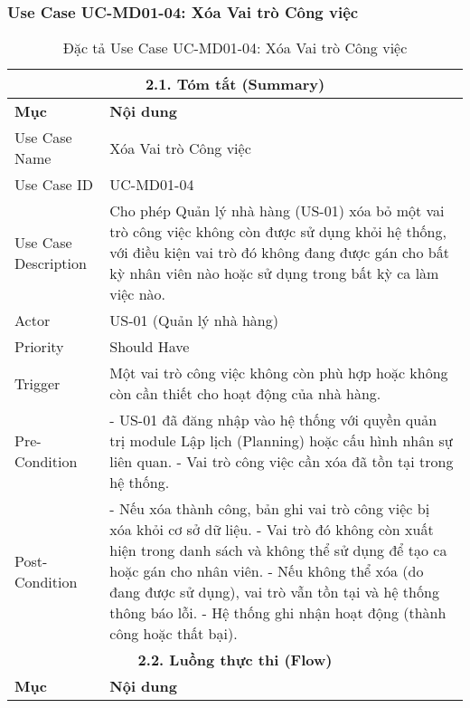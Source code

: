\subsubsection{Use Case UC-MD01-04: Xóa Vai trò Công việc}

\begin{longtable}{|m{4cm}|p{11cm}|}
\caption{Đặc tả Use Case UC-MD01-04: Xóa Vai trò Công việc} \label{tab:uc_md01_04_revised} \\
\hline
\multicolumn{2}{|c|}{\textbf{2.1. Tóm tắt (Summary)}} \\
\hline
\textbf{Mục} & \textbf{Nội dung} \\
\hline
\endhead %
\hline
\endfoot %
\hline
\endlastfoot %
Use Case Name & Xóa Vai trò Công việc \\
\hline
Use Case ID & UC-MD01-04 \\
\hline
Use Case Description & Cho phép Quản lý nhà hàng (US-01) xóa bỏ một vai trò công việc không còn được sử dụng khỏi hệ thống, với điều kiện vai trò đó không đang được gán cho bất kỳ nhân viên nào hoặc sử dụng trong bất kỳ ca làm việc nào. \\
\hline
Actor & US-01 (Quản lý nhà hàng) \\
\hline
Priority & Should Have \\
\hline
Trigger & Một vai trò công việc không còn phù hợp hoặc không còn cần thiết cho hoạt động của nhà hàng. \\
\hline
Pre-Condition & - US-01 đã đăng nhập vào hệ thống với quyền quản trị module Lập lịch (Planning) hoặc cấu hình nhân sự liên quan. \newline - Vai trò công việc cần xóa đã tồn tại trong hệ thống. \\
\hline
Post-Condition & - Nếu xóa thành công, bản ghi vai trò công việc bị xóa khỏi cơ sở dữ liệu. \newline - Vai trò đó không còn xuất hiện trong danh sách và không thể sử dụng để tạo ca hoặc gán cho nhân viên. \newline - Nếu không thể xóa (do đang được sử dụng), vai trò vẫn tồn tại và hệ thống thông báo lỗi. \newline - Hệ thống ghi nhận hoạt động (thành công hoặc thất bại). \\
\hline
\multicolumn{2}{|c|}{\textbf{2.2. Luồng thực thi (Flow)}} \\
\hline
\textbf{Mục} & \textbf{Nội dung} \\
\hline

\end{longtable}
